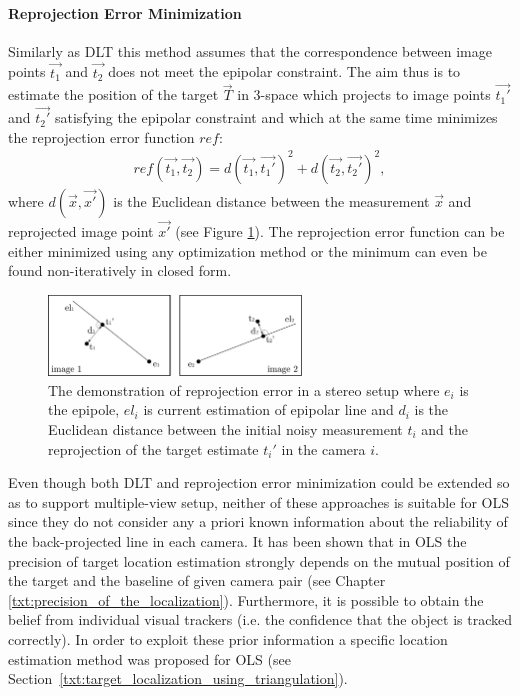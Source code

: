 \paragraph{Reprojection Error Minimization} Similarly as DLT this method assumes that the correspondence between image points $\vec{t_{1}}$ and $\vec{t_{2}}$ does not meet the epipolar constraint. The aim thus is to estimate the position of the target $\vec{T}$ in 3-space which projects to image points $\vec{t_{1}'}$ and $\vec{t_{2}'}$ satisfying the epipolar constraint and which at the same time minimizes the reprojection error function $ref$:
\begin{align}
	ref(\vec{t_{1}}, \vec{t_{2}}) = d(\vec{t_{1}}, \vec{t_{1}'})^{2} + d(\vec{t_{2}}, \vec{t_{2}'})^{2},
\end{align}
where $d(\vec{x}, \vec{x'})$ is the Euclidean distance between the measurement $\vec{x}$ and reprojected image point $\vec{x'}$ (see Figure \ref{fig:reprojection}). The reprojection error function can be either minimized using any optimization method or the minimum can even be found non-iteratively in closed form.

\begin{figure}[tbh]
	\centering
	\includegraphics[width=0.6\textwidth]{fig/reprojection.pdf}
	\caption{The demonstration of reprojection error in a stereo setup where $e_{i}$ is the epipole, $el_{i}$ is current estimation of epipolar line and $d_{i}$ is the Euclidean distance between the initial noisy measurement $t_{i}$ and the reprojection of the target estimate $t_{i}'$ in the camera $i$.}
	\label{fig:reprojection}
\end{figure}

Even though both DLT and reprojection error minimization could be extended so as to support multiple-view setup, neither of these approaches is suitable for OLS since they do not consider any a priori known information about the reliability of the back-projected line in each camera. It has been shown that in OLS the precision of target location estimation strongly depends on the mutual position of the target and the baseline of given camera pair (see Chapter \ref{txt:precision_of_the_localization}). Furthermore, it is possible to obtain the belief from individual visual trackers (i.e. the confidence that the object is tracked correctly). In order to exploit these prior information a specific location estimation method was proposed for OLS (see Section~\ref{txt:target_localization_using_triangulation}).

